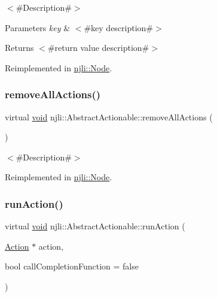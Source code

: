$<$\#\+Description\#$>$


\begin{DoxyParams}{Parameters}
{\em key} & $<$\#key description\#$>$\\
\hline
\end{DoxyParams}
\begin{DoxyReturn}{Returns}
$<$\#return value description\#$>$ 
\end{DoxyReturn}


Reimplemented in \mbox{\hyperlink{classnjli_1_1_node_ae469bbf7d36fd0ea3b78ff9ee8cc6dee}{njli\+::\+Node}}.

\mbox{\label{classnjli_1_1_abstract_actionable_a758cc11b09194399de63537e0f7e1485}} 
\subsubsection{\texorpdfstring{remove\+All\+Actions()}{removeAllActions()}}
{\footnotesize\ttfamily virtual \mbox{\hyperlink{_thread_8h_af1e856da2e658414cb2456cb6f7ebc66}{void}} njli\+::\+Abstract\+Actionable\+::remove\+All\+Actions (\begin{DoxyParamCaption}{ }\end{DoxyParamCaption})\hspace{0.3cm}{\ttfamily [virtual]}}

$<$\#\+Description\#$>$ 

Reimplemented in \mbox{\hyperlink{classnjli_1_1_node_ad497289960419c904082516aab4ab551}{njli\+::\+Node}}.

\mbox{\label{classnjli_1_1_abstract_actionable_af2020b25504138eb95c993b3a09c6500}} 
\subsubsection{\texorpdfstring{run\+Action()}{runAction()}\hspace{0.1cm}{\footnotesize\ttfamily [1/2]}}
{\footnotesize\ttfamily virtual \mbox{\hyperlink{_thread_8h_af1e856da2e658414cb2456cb6f7ebc66}{void}} njli\+::\+Abstract\+Actionable\+::run\+Action (\begin{DoxyParamCaption}\item[{\mbox{\hyperlink{classnjli_1_1_action}{Action}} $\ast$}]{action,  }\item[{bool}]{call\+Completion\+Function = {\ttfamily false} }\end{DoxyParamCaption})\hspace{0.3cm}{\ttfamily [virtual]}}

